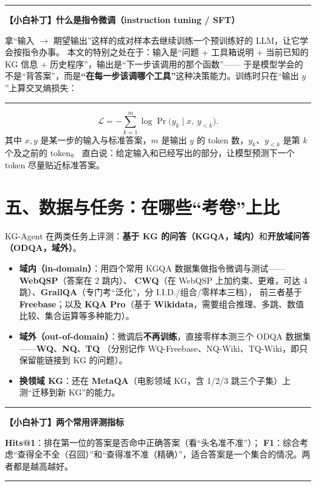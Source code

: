 \documentclass[11pt,UTF8,fontset=fandol]{ctexart}
\newenvironment{tip}[1]{%
  \par\smallskip\noindent\rule{\linewidth}{0.4pt}\par\nobreak
  \noindent\textbf{【小白补丁】#1}\par\nobreak\noindent\ignorespaces
}{%
  \par\noindent\rule{\linewidth}{0.4pt}\par\smallskip
}
\begin{document}
\begin{tip}{什么是指令微调（instruction tuning / SFT）}
拿“输入 $\to$ 期望输出”这样的成对样本去继续训练一个预训练好的 LLM，让它学会按指令办事。
本文的特别之处在于：输入是“问题 + 工具箱说明 + 当前已知的 KG 信息 + 历史程序”，输出是“下一步该调用的那个函数”——
于是模型学会的不是“背答案”，而是\textbf{“在每一步该调哪个工具”}这种决策能力。训练时只在“输出 $y$”上算交叉熵损失：
\end{tip}

\begin{equation*}
  \mathcal{L}=-\sum_{k=1}^{m}\log \Pr\big(y_k \mid x,\ y_{<k}\big). \tag{1}
\end{equation*}
其中 $x,y$ 是某一步的输入与标准答案，$m$ 是输出 $y$ 的 token 数，$y_k$、$y_{<k}$ 是第 $k$ 个及之前的 token。
直白说：给定输入和已经写出的部分，让模型预测下一个 token 尽量贴近标准答案。

\section{五、数据与任务：在哪些“考卷”上比}

KG-Agent 在两类任务上评测：\textbf{基于 KG 的问答（KGQA，域内）}和\textbf{开放域问答（ODQA，域外）}。

\begin{itemize}[leftmargin=2em]
  \item \textbf{域内（in-domain）}：用四个常用 KGQA 数据集做指令微调与测试——\textbf{WebQSP}（答案在 2 跳内）、
        \textbf{CWQ}（在 WebQSP 上加约束、更难，可达 4 跳）、\textbf{GrailQA}（专门考“泛化”，分 I.I.D./组合/零样本三档），
        前三者基于 \textbf{Freebase}；以及 \textbf{KQA Pro}（基于 \textbf{Wikidata}，需要组合推理、多跳、数值比较、集合运算等多种能力）。
  \item \textbf{域外（out-of-domain）}：微调后\textbf{不再训练}，直接零样本测三个 ODQA 数据集——\textbf{WQ}、\textbf{NQ}、\textbf{TQ}
        （分别记作 WQ-Freebase、NQ-Wiki、TQ-Wiki，即只保留能链接到 KG 的问题）。
  \item \textbf{换领域 KG}：还在 \textbf{MetaQA}（电影领域 KG，含 1/2/3 跳三个子集）上测“迁移到新 KG”的能力。
\end{itemize}

\begin{tip}{两个常用评测指标}
\textbf{Hits@1}：排在第一位的答案是否命中正确答案（看“头名准不准”）；
\textbf{F1}：综合考虑“查得全不全（召回）”和“查得准不准（精确）”，适合答案是一个集合的情况。两者都是越高越好。
\end{tip}
\end{document}
